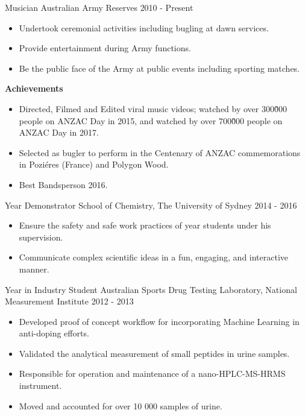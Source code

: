 
\begin{cventries}

\cventry
  {Musician} %
  {Australian Army Reserves} %
  {} %
  {2010 - Present} %
{%
\begin{itemize}
  \item Undertook ceremonial activities including bugling at dawn services.
  \item Provide entertainment during Army functions.
  \item Be the public face of the Army at public events including sporting matches.
\end{itemize}
\textbf{Achievements}
\begin{itemize}
  \item Directed, Filmed and Edited viral music videos;
     watched by over 300\~000 people on ANZAC Day in 2015,
    and  watched by over 700\~000 people on ANZAC Day in 2017.
  \item Selected as bugler to perform in the Centenary of ANZAC commemorations in Poziéres (France) and Polygon Wood.
  \item Best Bandsperson 2016.
\end{itemize}
}

\cventry
  { Year Demonstrator} %
  {School of Chemistry, The University of Sydney} %
  {} %
  {2014 - 2016} %
{%
  \begin{itemize}
    \item Ensure the safety and safe work practices
      of  year students under his supervision.
    \item Communicate complex scientific ideas
      in a fun, engaging, and interactive manner.
  \end{itemize}
}

\cventry
  {Year in Industry Student} %
  {Australian Sports Drug Testing Laboratory, National Measurement Institute} %
  {} %
  {2012 - 2013} %
{%
  \begin{itemize}
    \item Developed proof of concept workflow for incorporating Machine
      Learning in anti-doping efforts.
    \item Validated the analytical measurement of small peptides in urine samples.
    \item Responsible for operation and maintenance of a nano-HPLC-MS-HRMS instrument.
    \item Moved and accounted for over 10 000 samples of urine.
  \end{itemize}
}

\end{cventries}
